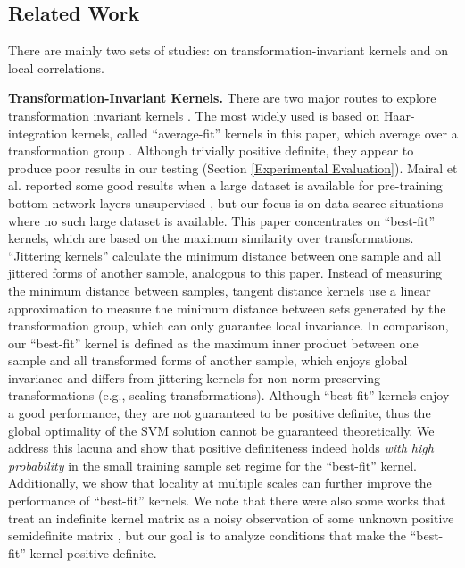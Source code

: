 \documentclass{article}
\theoremstyle{plain}
\theoremstyle{definition}
\theoremstyle{remark}
\begin{document}
\subsection{Related Work}
There are mainly two sets of studies: on transformation-invariant kernels and on local correlations.

\textbf{Transformation-Invariant Kernels.} There are two major routes to explore transformation invariant kernels \cite{scholkopf2002learning, lauer2008incorporating}. The most widely used is based on Haar-integration kernels, called ``average-fit'' kernels in this paper, which average over a transformation group \cite{schulz1994constructing, haasdonk2007invariant, ghiasi2010learning, mroueh2015learning, mairal2014convolutional, mei2021learning}. Although trivially positive definite, they appear to produce poor results in our testing (Section \ref{Experimental Evaluation}). Mairal et al. \cite{mairal2014convolutional} reported some good results when a large dataset is available for pre-training bottom network layers unsupervised \cite{ranzato2007unsupervised}, but our focus is on data-scarce situations where no such large dataset is available. This paper concentrates on ``best-fit'' kernels, which are based on the maximum similarity over transformations. ``Jittering kernels'' \cite{decoste2000distortion, decoste2002training} calculate the minimum distance between one sample and all jittered forms of another sample, analogous to this paper. Instead of measuring the minimum distance between samples, tangent distance kernels \cite{simard1998transformation, haasdonk2002tangent} use a linear approximation to measure the minimum distance between sets generated by the transformation group, which can only guarantee local invariance. In comparison, our ``best-fit'' kernel is defined as the maximum inner product between one sample and all transformed forms of another sample, which enjoys global invariance and differs from jittering kernels for non-norm-preserving transformations (e.g., scaling transformations). Although ``best-fit'' kernels enjoy a good performance, they are not guaranteed to be positive definite, thus the global optimality of the SVM solution cannot be guaranteed theoretically. We address this lacuna and show that positive definiteness indeed holds \textit{with high probability} in the small training sample set regime for the ``best-fit'' kernel. Additionally, we show that locality at multiple scales can further improve the performance of ``best-fit'' kernels. We note that there were also some works that treat an indefinite kernel matrix as a noisy observation of some unknown positive semidefinite matrix \cite{chen2008training, ying2009analysis}, but our goal is to analyze conditions that make the ``best-fit'' kernel positive definite.
\end{document}
